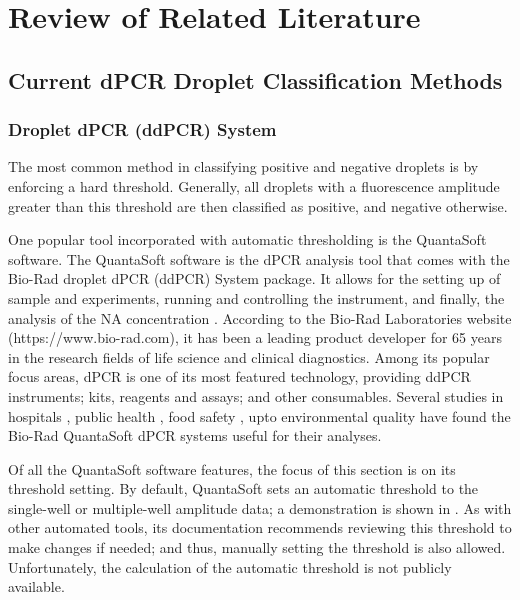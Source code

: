 \chapter{Review of Related Literature}
\label{sec:rrl} 

\section{Current dPCR Droplet Classification Methods}
\label{sec:dpcrclassifiers}

\subsection{Droplet dPCR (ddPCR) System}
\label{sec:ddpcrsystem}
The most common method in classifying positive and negative droplets is by enforcing a hard threshold. Generally, all droplets with a fluorescence amplitude greater than this threshold are then classified as positive, and negative otherwise. 

One popular tool incorporated with automatic thresholding is the QuantaSoft software. The QuantaSoft software is the dPCR analysis tool that comes with the Bio-Rad droplet dPCR (ddPCR) System package. It allows for the setting up of sample and experiments, running and controlling the instrument, and finally, the analysis of the NA concentration \cite{Bio-Rad2019}. According to the Bio-Rad Laboratories website (https://www.bio-rad.com), it has been a leading product developer for 65 years in the research fields of life science and clinical diagnostics. Among its popular focus areas, dPCR is one of its most featured technology, providing ddPCR instruments; kits, reagents and assays; and other consumables. Several studies in hospitals \cite{Lopez2016,Chen2018,Abed2017,Tagliapietra2020}, public health \cite{Hussain2017,Nystrand2018}, food safety \cite{Chen2020,Capobianco2020,Basanisi2020}, upto environmental quality \cite{Hamaguchi2018,Jahne2020,Dobnik2016,Mauvisseau2019} have found the Bio-Rad QuantaSoft dPCR systems useful for their analyses. 

Of all the QuantaSoft software features, the focus of this section is on its threshold setting. By default, QuantaSoft sets an automatic threshold to the single-well or multiple-well amplitude data; a demonstration is shown in . As with other automated tools, its documentation recommends reviewing this threshold to make changes if needed; and thus, manually setting the threshold is also allowed. Unfortunately, the calculation of the automatic threshold is not publicly available.


